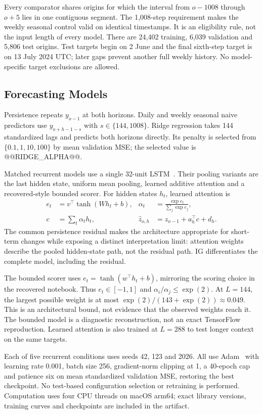 \documentclass[conference]{IEEEtran}
\begin{document}
Every comparator shares origins for which the interval from $o-1008$ through $o+5$ lies in one contiguous segment. The 1,008-step requirement makes the weekly seasonal control valid on identical timestamps. It is an eligibility rule, not the input length of every model. There are 24,402 training, 6,039 validation and 5,806 test origins. Test targets begin on 2 June and the final sixth-step target is on 13 July 2024 UTC; later gaps prevent another full weekly history. No model-specific target exclusions are allowed.

\subsection{Forecasting Models}
Persistence repeats $y_{o-1}$ at both horizons. Daily and weekly seasonal naive predictors use $y_{o+h-1-s}$ with $s\in\{144,1008\}$. Ridge regression takes 144 standardized lags and predicts both horizons directly. Its penalty is selected from $\{0.1,1,10,100\}$ by mean validation MSE; the selected value is @@RIDGE_ALPHA@@.

Matched recurrent models use a single 32-unit LSTM~\cite{lstm}. Their pooling variants are the last hidden state, uniform mean pooling, learned additive attention and a recovered-style bounded scorer. For hidden states $h_t$, learned attention is
\begin{align}
 e_t&=v^\top\tanh(Wh_t+b), &
 \alpha_t&=\frac{\exp e_t}{\sum_j\exp e_j},\\
 c&=\sum_t\alpha_t h_t, &
 \hat{z}_{o,h}&=z_{o-1}+a_h^\top c+d_h.
\end{align}
The common persistence residual makes the architecture appropriate for short-term changes while exposing a distinct interpretation limit: attention weights describe the pooled hidden-state path, not the residual path. IG differentiates the complete model, including the residual.

The bounded scorer uses $e_t=\tanh(w^\top h_t+b)$, mirroring the scoring choice in the recovered notebook. Thus $e_t\in[-1,1]$ and $\alpha_i/\alpha_j\leq\exp(2)$. At $L=144$, the largest possible weight is at most $\exp(2)/(143+\exp(2))\approx0.049$. This is an architectural bound, not evidence that the observed weights reach it. The bounded model is a diagnostic reconstruction, not an exact TensorFlow reproduction. Learned attention is also trained at $L=288$ to test longer context on the same targets.

Each of five recurrent conditions uses seeds 42, 123 and 2026. All use Adam~\cite{adam} with learning rate 0.001, batch size 256, gradient-norm clipping at 1, a 40-epoch cap and patience six on mean standardized validation MSE, restoring the best checkpoint. No test-based configuration selection or retraining is performed. Computation uses four CPU threads on macOS arm64; exact library versions, training curves and checkpoints are included in the artifact.
\end{document}
